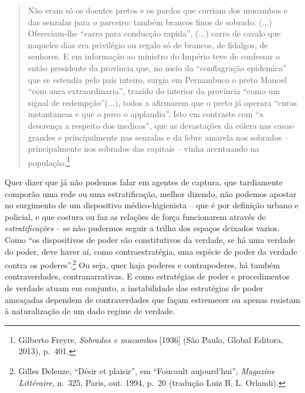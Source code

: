 \begin{quote}
Não eram só os doentes pretos e os pardos que corriam dos mucambos e das
senzalas para o parceiro: também brancos finos de sobrado. (...)
Ofereciam-lhe ``carro para conducção rapida'', (...) carro de cavalo que
naqueles dias era privilégio ou regalo só de brancos, de fidalgos, de
senhores. E em informação ao ministro do Império teve de confessar o
então presidente da província que, no meio da ``conflagração epidemica''
que se estendia pelo país inteiro, surgia em Pernambuco o preto Manoel
``com aura extraordinaria'', trazido do interior da província ``como um
signal de redempção''(...), todos a afirmarem que o preto já operara
``curas instantaneas e que o povo o applaudia''. Isto em contraste com
``a descrença a respeito dos medicos'', que as devastações da cólera nas
casas-grandes e principalmente nas senzalas e da febre amarela nos
sobrados -- principalmente nos sobrados das capitais -- vinha acentuando
na população.\footnote{Gilberto Freyre, \emph{Sobrados e mucambos}
  {[}1936{]} (São Paulo, Global Editora, 2013), p.~401.}
\end{quote}

Quer dizer que já não podemos falar em agentes de captura, que
tardiamente comporão uma rede ou uma estratificação, melhor dizendo, não
podemos apostar no surgimento de um dispositivo médico-higienista -- que
é por definição urbano e policial, e que costura ou faz as relações de
força funcionarem através de \emph{estratificações} -- se não pudermos
seguir a trilha dos espaços deixados vazios. Como ``os dispositivos de
poder são constitutivos da verdade, se há uma verdade do poder, deve
haver aí, como contraestratégia, uma espécie de poder da verdade contra
os poderes''.\footnote{Gilles Deleuze, ``Désir et plaisir'', em
  ``Foucault aujourd'hui'', \emph{Magazine Littéraire}, n.~325, Paris,
  out. 1994, p.~20 (tradução Luiz B. L. Orlandi).} Ou seja, quer haja
poderes e contrapoderes, há também contraverdades, contranarrativas. E
como estratégias de poder e procedimentos de verdade atuam em conjunto,
a instabilidade das estratégias de poder ameaçadas dependem de
contraverdades que façam estremecer ou apenas resistam à naturalização
de um dado regime de verdade.

